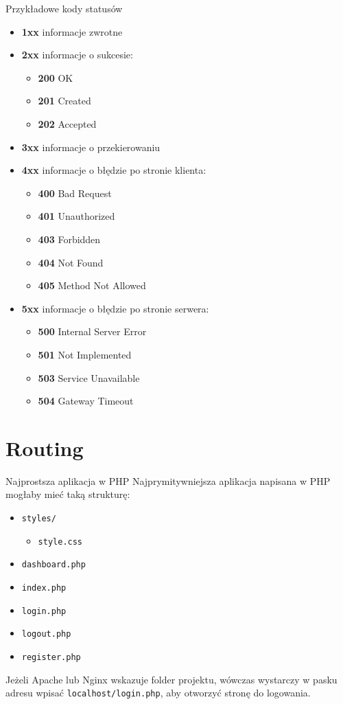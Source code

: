 \begin{frame}{Przykładowe kody statusów}	
	\begin{itemize}
		\item \textbf{1xx} informacje zwrotne
		\item \textbf{2xx} informacje o sukcesie:
		\begin{itemize}
			\item \textbf{200} OK
			\item \textbf{201} Created
			\item \textbf{202} Accepted
		\end{itemize}
		\item \textbf{3xx} informacje o przekierowaniu
		\item \textbf{4xx} informacje o błędzie po stronie klienta:
		\begin{itemize}
			\item \textbf{400} Bad Request
			\item \textbf{401} Unauthorized
			\item \textbf{403} Forbidden
			\item \textbf{404} Not Found
			\item \textbf{405} Method Not Allowed
		\end{itemize}
		\item \textbf{5xx} informacje o błędzie po stronie serwera:
		\begin{itemize}
			\item \textbf{500} Internal Server Error
			\item \textbf{501} Not Implemented
			\item \textbf{503} Service Unavailable
			\item \textbf{504} Gateway Timeout
		\end{itemize}
	\end{itemize}
\end{frame}

\section{Routing}

\begin{frame}{Najprostsza aplikacja w PHP}
	Najprymitywniejsza aplikacja napisana w PHP mogłaby mieć taką strukturę:

	\begin{itemize}
		\item \texttt{styles/}
		\begin{itemize}
			\item \texttt{style.css}
		\end{itemize}
		\item \texttt{dashboard.php}
		\item \texttt{index.php}
		\item \texttt{login.php}
		\item \texttt{logout.php}
		\item \texttt{register.php}
	\end{itemize}
	
	Jeżeli Apache lub Nginx wskazuje folder projektu, wówczas wystarczy w pasku adresu wpisać \texttt{localhost/login.php}, aby otworzyć stronę do logowania.
\end{frame}

